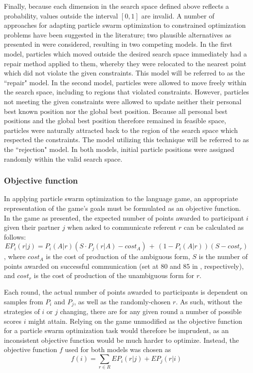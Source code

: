 \documentclass[12pt,a4paper]{article}
\begin{document}
Finally, because each dimension in the search space defined above reflects a probability, values outside the interval $[0, 1]$ are invalid. A number of approaches for adapting particle swarm optimization to constrained optimization problems have been suggested in the literature; two plausible alternatives as presented in \cite{engelbrecht2005} were considered, resulting in two competing models. 
In the first model, particles which moved outside the desired search space immediately had a repair method applied to them, whereby they were relocated to the nearest point which did not violate the given constraints. This model will be referred to as the ``repair" model. In the second model, particles were allowed to move freely within the search space, including to regions that violated constraints. However, particles not meeting the given constraints were allowed to update neither their personal best known position nor the global best position. Because all personal best positions and the global best position therefore remained in feasible space, particles were naturally attracted back to the region of the search space which respected the constraints. The model utilizing this technique will be referred to as the ``rejection" model. In both models, initial particle positions were assigned randomly within the valid search space.


 
\subsubsection{Objective function}
In applying particle swarm optimization to the \citeauthor{rohde2012} language game, an appropriate representation of the game's goals must be formulated as an objective function. In the game as presented, the expected number of points awarded to participant $i$ given their partner $j$ when asked to communicate referent $r$ can be calculated as follows:
\begin{equation}
EP_{i}(r|j) = P_i(A|r)(S \cdot P_j(r|A) - cost_A) \,+\, (1 - P_i(A|r))(S - cost_r) 
\end{equation},
where $cost_A$ is the cost of production of the ambiguous form, $S$ is the number of points awarded on successful communication (set at 80 and 85 in \citeauthor{rohde2012}, respectively), and $cost_r$ is the cost of production of the unambiguous form for $r$.

Each round, the actual number of points awarded to participants is dependent on samples from $P_i$ and $P_j$, as well as the randomly-chosen $r$. As such, without the strategies of $i$ or $j$ changing, there are for any given round a number of possible scores $i$ might attain. Relying on the game unmodified as the objective function for a particle swarm optimization task would therefore be imprudent, as an inconsistent objective function would be much harder to optimize. Instead, the objective function $f$ used for both models was chosen as 
\begin{equation}
f(i) = \sum_{r \in R} EP_{i}(r|j) + EP_{j}(r|i)
\end{equation}
\end{document}
